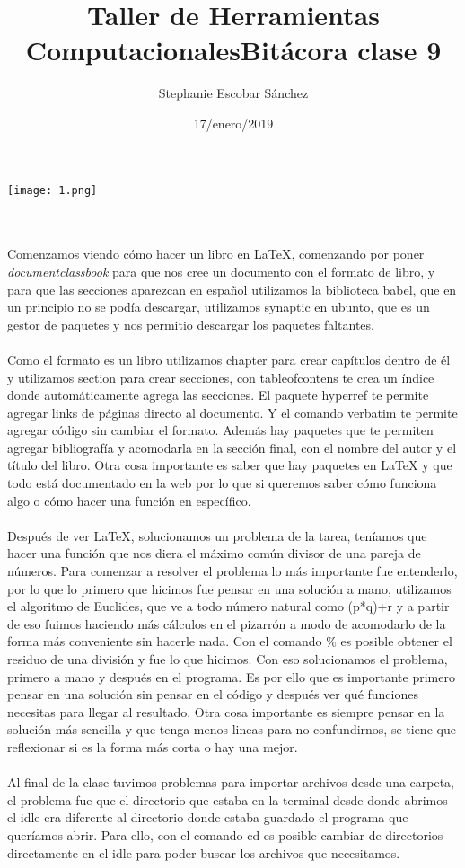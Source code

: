 \documentclass{article}
\title{\Huge Taller de Herramientas Computacionales}
\author{Stephanie Escobar Sánchez}
\date{17/enero/2019}
\begin{document}
	\maketitle
\begin{center}
	\texttt{[image: 1.png]}	
\end{center}
\newpage
\title{\Huge Bitácora clase 9} \\
\\
Comenzamos viendo cómo hacer un libro en LaTeX, comenzando por poner \textit{documentclass{book}} para que nos cree un documento con el formato de libro, y para que las secciones aparezcan en español utilizamos la biblioteca babel, que en un principio no se podía descargar, utilizamos synaptic en ubunto, que es un gestor de paquetes y nos permitio descargar los paquetes faltantes.\\
\\
Como el formato es un libro utilizamos chapter{} para crear capítulos dentro de él y utilizamos section{} para crear secciones, con tableofcontens te crea un índice donde automáticamente agrega las secciones. El paquete hyperref te permite agregar links de páginas directo al documento. Y el comando verbatim te permite agregar código sin cambiar el formato. Además hay paquetes que te permiten agregar bibliografía y acomodarla en la sección final, con el nombre del autor y el título del libro. Otra cosa importante es saber que hay paquetes en LaTeX y que todo está documentado en la web por lo que si queremos saber cómo funciona algo o cómo hacer una función en específico. \\
\\
Después de ver LaTeX, solucionamos un problema de la tarea, teníamos que hacer una función que nos diera el máximo común divisor de una pareja de números. Para comenzar a resolver el problema lo más importante fue entenderlo, por lo que lo primero que hicimos fue pensar en una solución a mano, utilizamos el algoritmo de Euclides, que ve a todo número natural como (p*q)+r y a partir de eso fuimos haciendo más cálculos en el pizarrón a modo de acomodarlo de la forma más conveniente sin hacerle nada. Con el comando \% es posible obtener el residuo de una división y fue lo que hicimos. Con eso solucionamos el problema, primero a mano y después en el programa. Es por ello que es importante primero pensar en una solución sin pensar en el código y después ver qué funciones necesitas para llegar al resultado. Otra cosa importante es siempre pensar en la solución más sencilla y que tenga menos lineas para no confundirnos, se  tiene que reflexionar si es la forma más corta o hay una mejor.\\
\\
Al final de la clase tuvimos problemas para importar archivos desde una carpeta, el problema fue que el directorio que estaba en la terminal desde donde abrimos el idle era diferente al directorio donde estaba guardado el programa que queríamos abrir. Para ello, con el comando cd es posible cambiar de directorios directamente en el idle para poder buscar los archivos que necesitamos. 
\end{document}
